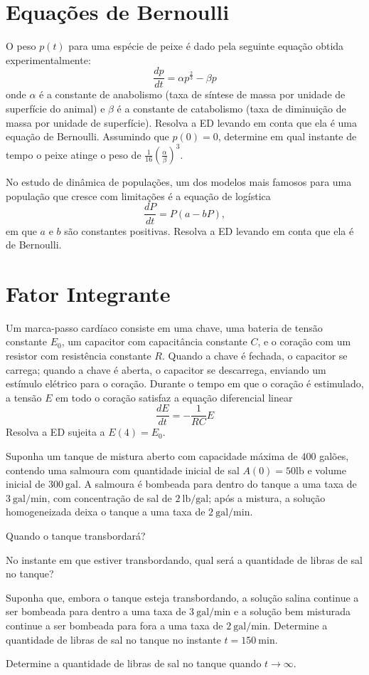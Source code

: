 \documentclass[oneside,12pt,a4paper]{report}
\begin{document}
\section{Equações de Bernoulli}

 O peso $p(t)$ para uma espécie de peixe é dado pela seguinte equação obtida experimentalmente:
\[\frac{dp}{dt}=\alpha p^\frac{2}{3}-\beta p\]
onde $\alpha$ é a constante de anabolismo (taxa de síntese de massa por unidade de superfície do animal) e $\beta$ é a constante de catabolismo (taxa de diminuição de massa por unidade de superfície). Resolva a ED levando em conta que ela é uma equação de Bernoulli. Assumindo que $p(0)=0$, determine em qual instante de tempo o peixe atinge o peso de $\frac{1}{16}\left(\frac{\alpha}{\beta}\right)^3$.

 No estudo de dinâmica de populações, um dos modelos mais famosos para uma população que cresce com limitações é a equação de logística
\[\frac{dP}{dt}=P(a-bP),\]
em que $a$ e $b$ são constantes positivas. Resolva a ED levando em conta que ela é de Bernoulli.

\section{Fator Integrante}

 Um marca-passo cardíaco consiste em uma chave, uma bateria de tensão constante $E_0$, um capacitor com capacitância constante $C$, e o coração com um resistor com resistência constante $R$. Quando a chave é fechada, o capacitor se carrega; quando a chave é aberta, o capacitor se descarrega, enviando um estímulo elétrico para o coração. Durante o tempo em que  o coração é estimulado, a tensão $E$ em todo o coração satisfaz a equação diferencial linear
\[\frac{dE}{dt}=-\frac{1}{RC}E\]
Resolva a ED sujeita a $E(4)=E_0$.

 Suponha um tanque de mistura aberto com capacidade máxima de $400$ galões, contendo uma salmoura com quantidade inicial de sal $A(0)=50 \mathrm{lb}$ e volume inicial de $300~\mathrm{gal}$. A salmoura é bombeada para dentro do tanque a uma taxa de $3~\mathrm{gal/min}$, com concentração de sal de $2~\mathrm{lb/gal}$; após a mistura, a solução homogeneizada deixa o tanque a uma taxa de $2~\mathrm{gal/min}$.
\begin{itensquestao}
    \item Quando o tanque transbordará?
    \item No instante em que estiver transbordando, qual será a quantidade de libras de sal no tanque?
    \item Suponha que, embora o tanque esteja transbordando, a solução salina continue a ser bombeada para dentro a uma taxa de $3~\mathrm{gal/min}$ e a solução bem misturada continue a ser bombeada para fora a uma taxa de $2~\mathrm{gal/min}$. Determine a quantidade de libras de sal no tanque no instante $t=150~\mathrm{min}$.
    \item Determine a quantidade de libras de sal no tanque quando $t\to\infty$.
\end{itensquestao}
\end{document}

